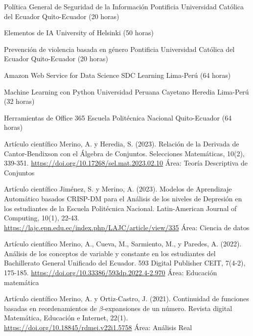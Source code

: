 \documentclass[
	a4paper,
	maincolor=cvblue!70!blue,
	sidecolor=gray!30,
	sectioncolor=cvblue!70!blue,
    sidebarwidth=7.5cm,
	topbottommargin=20pt,
	leftrightmargin=20pt,
]{fortysecondscv}
\begin{document}
    {Política General de Seguridad de la Información}
    {Pontificia Universidad Católica del Ecuador}
    {Quito-Ecuador (20 horas)}

    {Elementos de IA}
    {University of Helsinki}
    {(50 horas)}

    {Prevención de violencia basada en género}
    {Pontificia Universidad Católica del Ecuador}
    {Quito-Ecuador (20 horas)}

    {Amazon Web Service for Data Science}
    {SDC Learning}
    {Lima-Perú (64 horas)}

    {Machine Learning con Python}
    {Universidad Peruana Cayetano Heredia}
    {Lima-Perú (32 horas)}

    {Herramientas de Office 365}
    {Escuela Politécnica Nacional}
    {Quito-Ecuador (64 horas)}



    {Artículo científico}
    {Merino, A. y Heredia, S. (2023). Relación de la Derivada de Cantor-Bendixson con el Álgebra de Conjuntos. Selecciones Matemáticas, 10(2), 339-351.}
    {\url{https://doi.org/10.17268/sel.mat.2023.02.10}}
    {Área: Teoría Descriptiva de Conjuntos}
    
    {Artículo científico}
    {Jiménez, S. y Merino, A. (2023). Modelos de Aprendizaje Automático basados CRISP-DM para el Análisis de los niveles de Depresión en los estudiantes de la Escuela Politécnica Nacional. Latin-American Journal of Computing, 10(1), 22-43.}     
    {\url{https://lajc.epn.edu.ec/index.php/LAJC/article/view/335}}
    {Área: Ciencia de datos}
    
    {Artículo científico}
    {Merino, A., Cueva, M., Sarmiento, M., y Paredes, A. (2022). Análisis de los conceptos de variable y constante en los estudiantes del Bachillerato General Unificado del Ecuador. 593 Digital Publisher CEIT, 7(4-2), 175-185.}     
    {\url{https://doi.org/10.33386/593dp.2022.4-2.970}}
    {Área: Educación matemática}
    
    {Artículo científico}
    {Merino, A. y Ortiz-Castro, J. (2021). Continuidad de funciones basadas en reordenamientos de $\beta$-expansiones de un número. Revista digital Matemática, Educación e Internet, 22(1).}     
    {\url{https://doi.org/10.18845/rdmei.v22i1.5758}}
    {Área: Análisis Real}
    
\end{document}
